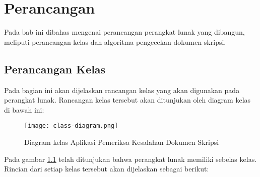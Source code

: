 \chapter{Perancangan}
\label{chap:Perancangan}

Pada bab ini dibahas mengenai perancangan perangkat lunak yang dibangun, meliputi perancangan kelas dan algoritma pengecekan dokumen skripsi.

\section{Perancangan Kelas}
Pada bagian ini akan dijelaskan rancangan kelas yang akan digunakan pada perangkat lunak. Rancangan kelas tersebut akan ditunjukan oleh diagram kelas di bawah ini:

\begin{figure}[H]
	\centering	
	\texttt{[image: class-diagram.png]}
	\caption{Diagram kelas Aplikasi Pemeriksa Kesalahan Dokumen Skripsi}	
	\label{fig:diagram_kelas} 
\end{figure}

Pada gambar \ref{fig:diagram_kelas} telah ditunjukan bahwa perangkat lunak memiliki sebelas kelas. Rincian dari setiap kelas tersebut akan dijelaskan sebagai berikut:

